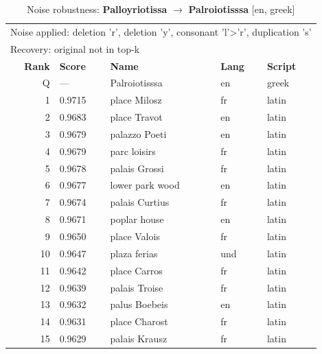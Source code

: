 \begin{table}[htbp]
\centering
\small
\caption{Noise robustness: \textbf{Palloyriotissa} $\rightarrow$ \textbf{Palroiotisssa} [en, greek]}
\label{tab:noise-29}
\begin{tabular}{rllll}
\toprule
\multicolumn{5}{l}{\small Noise applied: deletion 'r', deletion 'y', consonant 'l'>'r', duplication 's'} \\
\multicolumn{5}{l}{\small Recovery: original not in top-k} \\
\midrule
\textbf{Rank} & \textbf{Score} & \textbf{Name} & \textbf{Lang} & \textbf{Script} \\
\midrule
\rowcolor{gray!20} Q & --- & Palroiotisssa & en & greek \\
\midrule
1 & 0.9715 & place Milosz & fr & latin \\
2 & 0.9683 & place Travot & en & latin \\
3 & 0.9679 & palazzo Poeti & en & latin \\
4 & 0.9679 & parc loisirs & fr & latin \\
5 & 0.9678 & palais Grossi & fr & latin \\
6 & 0.9677 & lower park wood & en & latin \\
7 & 0.9674 & palais Curtius & fr & latin \\
8 & 0.9671 & poplar house & en & latin \\
9 & 0.9650 & place Valois & fr & latin \\
10 & 0.9647 & plaza ferias & und & latin \\
11 & 0.9642 & place Carros & fr & latin \\
12 & 0.9639 & palais Troise & fr & latin \\
13 & 0.9632 & palus Boebeis & en & latin \\
14 & 0.9631 & place Charost & fr & latin \\
15 & 0.9629 & palais Krausz & fr & latin \\
\bottomrule
\end{tabular}
\end{table}

